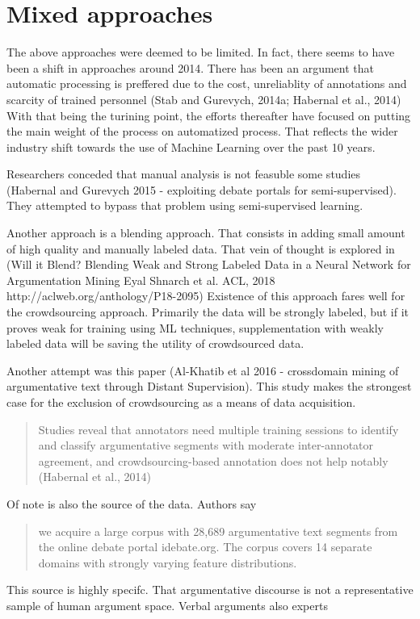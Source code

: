 \documentclass{report}
\begin{document}
\section{Mixed approaches}
The above approaches were deemed to be limited. In fact, there seems to have been a shift in approaches around 2014.
There has been an argument that automatic processing is preffered due to the cost, unreliablity of annotations and scarcity of trained personnel
(Stab and Gurevych, 2014a; Habernal et al., 2014)
With that being the turining point, the efforts thereafter have focused on putting the main weight of the process on automatized process. 
That reflects the wider industry shift towards the use of Machine Learning over the past 10 years.

Researchers conceded that manual analysis is not feasuble some studies (Habernal and Gurevych 2015 - exploiting debate portals for semi-supervised).
They attempted to bypass that problem using semi-supervised learning.

Another approach is a blending approach. That consists in adding small amount of high quality and manually labeled data.
That vein of thought is explored in (Will it Blend? Blending Weak and Strong Labeled Data in a Neural Network for Argumentation Mining Eyal Shnarch et al.
ACL, 2018 http://aclweb.org/anthology/P18-2095)
Existence of this approach fares well for the crowdsourcing approach. Primarily the data will be strongly labeled, but if it proves weak for training using ML techniques, 
supplementation with weakly labeled data will be saving the utility of crowdsourced data.

Another attempt was this paper (Al-Khatib et al 2016 - crossdomain mining of argumentative text through Distant Supervision).
This study makes the strongest case for the exclusion of crowdsourcing as a means of data acquisition.
\begin{quote}
 Studies reveal that annotators need multiple training sessions to identify and classify argumentative segments with moderate inter-annotator agreement, and crowdsourcing-based annotation does not help notably (Habernal et al., 2014)
\end{quote}
Of note is also the source of the data. Authors say
\begin{quote}
 we acquire a large corpus with 28,689 argumentative text segments from the online debate portal idebate.org. The corpus covers 14 separate domains with strongly varying feature distributions.
\end{quote}
This source is highly specifc. That argumentative discourse is not a representative sample of human argument space. Verbal arguments
also experts 
\end{document}
